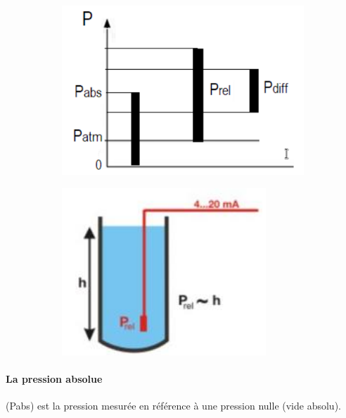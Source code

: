 \documentclass{article}
\begin{document}
            \begin{figure}[H]
                \centering
                \begin{subfigure}[b]{0.3\linewidth}
                    \includegraphics[width=\linewidth]{./images/012-pressions.png}
                \end{subfigure}
                \begin{subfigure}[b]{0.25\linewidth}
                    \includegraphics[width=\linewidth]{./images/013-pressions.png}
                \end{subfigure}
            \end{figure}

            \paragraph{La pression absolue} (Pabs) est la pression mesurée en référence à une pression nulle (vide absolu).
\end{document}
